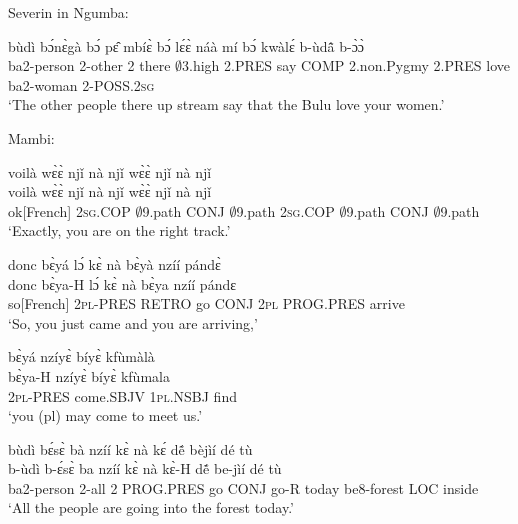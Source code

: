 \noindent Severin in Ngumba:

\begin{exe} 
\exC\label{131}
  \gll bùdì bɔ́nɛ̀gà bɔ́ pɛ̂ mbíɛ̀ bɔ́ lɛ́ɛ̀ náà mí bɔ́ kwàlɛ́ b-ùdã̂ b-ɔ̀ɔ̀ \\
         ba2-person 2-other 2 there $\emptyset$3.high 2.PRES say COMP 2.non.Pygmy 2.PRES love ba2-woman 2-POSS.2\textsc{sg} \\
    \trans `The other people there up stream say that the Bulu love your women.'
\end{exe}

\noindent Mambi:

\begin{exe} 
\exC\label{132}
  \glll  voilà wɛ̀ɛ̀ njǐ nà njǐ wɛ̀ɛ̀ njǐ nà njǐ\\
        voilà wɛ̀ɛ̀ njǐ nà njǐ wɛ̀ɛ̀ njǐ nà njǐ\\
          ok[French] 2\textsc{sg}.COP $\emptyset$9.path CONJ $\emptyset$9.path 2\textsc{sg}.COP $\emptyset$9.path CONJ $\emptyset$9.path\\
    \trans `Exactly, you are on the right track.'
\end{exe}

\begin{exe} 
\exC\label{133} 
  \glll  donc bɛ̀yá lɔ́ kɛ̀ nà bɛ̀yà nzíí pándɛ̀ \\
          donc bɛ̀ya-H lɔ́ kɛ̀ nà bɛ̀ya nzíí pándɛ \\
          so[French] 2\textsc{pl}-PRES RETRO go CONJ 2\textsc{pl} PROG.PRES arrive \\
    \trans `So, you just came and you are arriving,'
\end{exe}

\begin{exe} 
\exC\label{134}
  \glll  bɛ̀yá nzíyɛ̀ bíyɛ̀ kfùmàlà \\
         bɛ̀ya-H nzíyɛ̀ bíyɛ̀ kfùmala \\
         2\textsc{pl}-PRES  come.SBJV 1\textsc{pl}.NSBJ find  \\
    \trans `you (pl) may come to meet us.'
\end{exe}

\begin{exe} 
\exC\label{135} 
  \glll  bùdì bɛ́sɛ̀ bà nzíí kɛ̀ nà kɛ́ dẽ́ bèjìí dé tù \\
       b-ùdì b-ɛ́sɛ̀ ba nzíí kɛ̀ nà kɛ̀-H dẽ́ be-jìí dé tù \\
         ba2-person 2-all 2 PROG.PRES go CONJ go-R today be8-forest LOC inside   \\
    \trans `All the people are going into the forest today.'
\end{exe}

